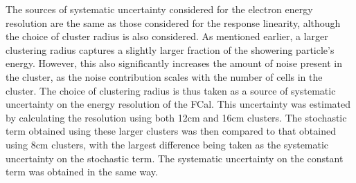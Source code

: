 %
%
%
%
%
%
%
%
%
%
%
%

The sources of systematic uncertainty considered for the electron energy resolution are the same as those  considered for the response linearity, although the choice of cluster radius is also considered. As mentioned earlier, a larger clustering radius captures a slightly larger fraction of the showering particle's energy. However, this also significantly increases the amount of noise present in the cluster, as the noise contribution scales with the number of cells in the cluster. The choice of clustering radius is thus taken as a source of systematic uncertainty on the energy resolution of the FCal. This uncertainty was estimated by calculating the resolution using both 12cm and 16cm clusters. The stochastic term obtained using these larger clusters was then compared to that obtained using 8cm clusters, with the largest difference being taken as the systematic uncertainty on the stochastic term. The systematic uncertainty on the constant term was obtained in the same way.


